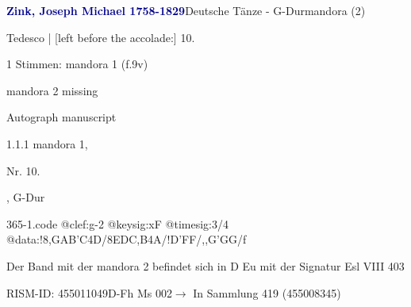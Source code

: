 \documentclass[twocolumn]{book}
\begin{document}
\par \vspace{7pt} \textcolor{darkblue}{\textbf{Zink, Joseph Michael  1758-1829}}\hfillplus{\textbf{[365]}}\newline Deutsche Tänze - G-Dur\newline mandora (2)
\par \begin{itshape}[f.9v, at left:] Tedesco | [left before the accolade:] 10.\end{itshape} 
\par \textcolor{darkblue}{}  1 Stimmen: mandora 1  (f.9v)\newline \begin{small} mandora 2 missing\end{small} \newline Autograph manuscript
\par 1.1.1  mandora 1, \begin{itshape}Nr. 10.\end{itshape}, G-Dur  
\begin{filecontents*}{365-1.code}
@clef:g-2
@keysig:xF
@timesig:3/4
@data:!{8,GAB'C}4D/{8EDC,B}4A/!D'FF/,,G'GG/f
\end{filecontents*}
\newline
%
\par Der Band mit der mandora 2 befindet sich in D Eu mit der Signatur Esl VIII 403
\par RISM-ID: 455011049\newline D-Fh  Ms 002\newline $\rightarrow$ In Sammlung 419 (455008345)
      
\end{document}
